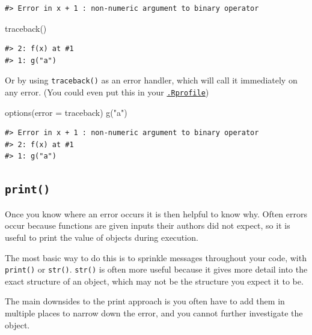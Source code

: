 \documentclass[
  letterpaper,
]{book}
\newenvironment{Shaded}{\begin{snugshade}}{\end{snugshade}}
\newcommand{\AttributeTok}[1]{\textcolor[rgb]{0.40,0.45,0.13}{#1}}
\newcommand{\FunctionTok}[1]{\textcolor[rgb]{0.28,0.35,0.67}{#1}}
\newcommand{\NormalTok}[1]{\textcolor[rgb]{0.00,0.23,0.31}{#1}}
\newcommand{\StringTok}[1]{\textcolor[rgb]{0.13,0.47,0.30}{#1}}
\begin{document}
\begin{verbatim}
#> Error in x + 1 : non-numeric argument to binary operator
\end{verbatim}

\begin{Shaded}
\begin{Highlighting}[]
\FunctionTok{traceback}\NormalTok{()}
\end{Highlighting}
\end{Shaded}

\begin{verbatim}
#> 2: f(x) at #1
#> 1: g("a")
\end{verbatim}

Or by using \texttt{traceback()} as an error handler, which will call it
immediately on any error. (You could even put this in your
\protect\hyperlink{rprofile}{\texttt{.Rprofile}})

\begin{Shaded}
\begin{Highlighting}[]
\FunctionTok{options}\NormalTok{(}\AttributeTok{error =}\NormalTok{ traceback)}
\FunctionTok{g}\NormalTok{(}\StringTok{"a"}\NormalTok{)}
\end{Highlighting}
\end{Shaded}

\begin{verbatim}
#> Error in x + 1 : non-numeric argument to binary operator
#> 2: f(x) at #1
#> 1: g("a")
\end{verbatim}

\hypertarget{print}{%
\subsection*{\texorpdfstring{\texttt{print()}}{print()}}\label{print}}

Once you know where an error occurs it is then helpful to know why.
Often errors occur because functions are given inputs their authors did
not expect, so it is useful to print the value of objects during
execution.

The most basic way to do this is to sprinkle messages throughout your
code, with \texttt{print()} or \texttt{str()}. \texttt{str()} is often
more useful because it gives more detail into the exact structure of an
object, which may not be the structure you expect it to be.

The main downsides to the print approach is you often have to add them
in multiple places to narrow down the error, and you cannot further
investigate the object.
\end{document}
